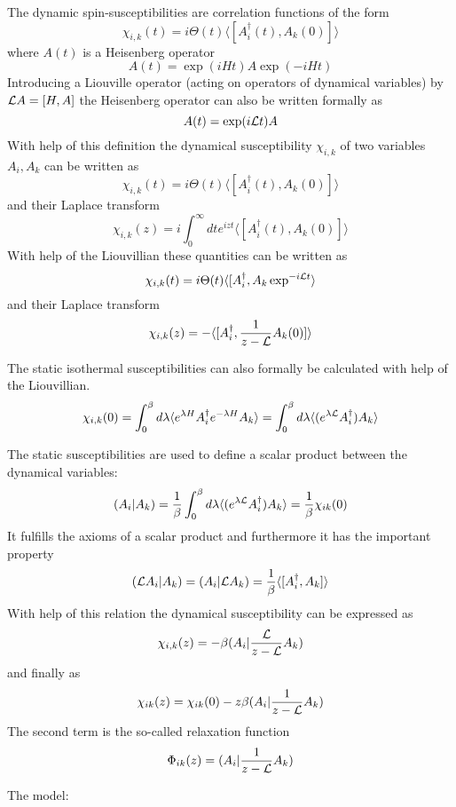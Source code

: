 The dynamic spin-susceptibilities are correlation functions of the form
$$
\chi_{i,k}(t)=i \Theta(t) \langle [A_i^\dagger(t),A_k(0)]\rangle
$$ 
where $A(t)$ is a Heisenberg operator
$$
A(t)= \exp(iHt)A\exp(-iHt)
$$
Introducing a Liouville operator (acting on operators of dynamical
variables) by ${\cal L}A = [H,A]$  the Heisenberg operator can also be
written formally as  
$$
A(t)= \exp(i{\cal L}t) A
$$
With help of this definition the dynamical susceptibility $\chi_{i,k}$ of 
two variables $A_i, A_k$ can be written as
$$
\chi_{i,k}(t)=i \Theta(t) \langle [A_i^\dagger(t),A_k(0)]\rangle
$$ 
and their Laplace transform
$$
\chi_{i,k}(z)=i\int_0^\infty dt e^{izt} \langle [A_i^\dagger(t),A_k(0)]\rangle
$$ 
With help of the Liouvillian these quantities can be written as
$$
\chi_{i,k}(t)=i \Theta(t) \langle [A_i^\dagger,A_k\exp^{-i{\cal L}t}\rangle
$$
and their Laplace transform
$$
\chi_{i,k}(z)= -\langle [A_i^\dagger,{1\over {z-\cal
L}}A_k(0)]\rangle
$$ 

The static isothermal susceptibilities can also formally be calculated with help of
the Liouvillian.   
$$
\chi_{i,k}(0) = \int_0^\beta d \lambda \langle e^{\lambda H}
A_i^\dagger e^{-\lambda H}  A_k\rangle
 = \int_0^\beta d \lambda \langle (e^{\lambda {\cal L}}
A_i^\dagger)   A_k\rangle
$$


The static susceptibilities are used to define a scalar product between  the
dynamical variables:
$$
(A_i \vert A_k) =  {1\over \beta }\int_0^\beta d\lambda \langle
(e^{\lambda{\cal L}}A_i^\dagger)A_k\rangle ={1\over \beta} \chi_{ik}(0)
$$
It fulfills the axioms of a scalar product and  furthermore it has the important property
$$
({\cal L}A_i\vert A_k)=(A_i\vert {\cal L}A_k)={1\over \beta}\langle
[A_i^\dagger,A_k]\rangle
$$
With help of this relation the dynamical susceptibility can be
expressed as
$$
\chi_{i,k}(z)= -\beta (A_i\vert {{\cal L}\over {z-\cal L}} A_k)
$$
and finally as 
$$
\chi_{ik}(z)=\chi_{ik}(0)-z\beta (A_i\vert {1\over {z-\cal L}}A_k)  
$$
The second term is the so-called relaxation function 
$$
\Phi_{ik}(z)=(A_i \vert {1 \over {z-\cal L}}A_k)
$$

\bigskip







\noindent
The model:



